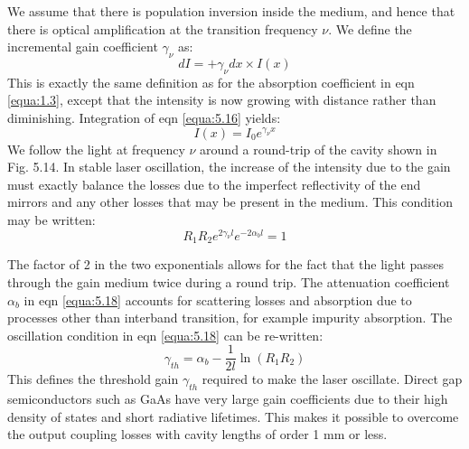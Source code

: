 \documentclass[12pt]{book}
\begin{document}
We assume that there is population inversion inside the medium, and hence that there is optical amplification at the transition frequency $\nu$. We define the incremental gain coefficient $\gamma_{\nu}$ as:
\begin{equation}\label{equa:5.16}
  dI=+\gamma_{\nu}dx\times I(x)
\end{equation}
This is exactly the same definition as for the absorption coefficient in eqn \ref{equa:1.3}, except that the intensity is now growing with distance rather than diminishing. Integration of eqn \ref{equa:5.16} yields:
\begin{equation}\label{equa:5.17}
  I(x)=I_0e^{\gamma_{\nu}x}
\end{equation}
We follow the light at frequency $\nu$ around a round-trip of the cavity shown in Fig. 5.14. In stable laser oscillation, the increase of the intensity due to the gain must exactly balance the losses due to the imperfect reflectivity of the end mirrors and any other losses that may be present in the medium. This condition may be written:
\begin{equation}\label{equa:5.18}
  R_1R_2e^{2\gamma_{\nu}l}e^{-2\alpha_bl}=1
\end{equation}

The factor of 2 in the two exponentials allows for the fact that the light passes through the gain medium twice during a round trip. The attenuation coefficient $\alpha_b$ in eqn \ref{equa:5.18} accounts for scattering losses and absorption due to processes other than interband transition, for example impurity absorption. The oscillation condition in eqn \ref{equa:5.18} can be re-written:
\begin{equation}\label{equa:5.19}
  \gamma_{th}=\alpha_b-\frac{1}{2l}\ln(R_1R_2)
\end{equation}
This defines the threshold gain $\gamma_{th}$ required to make the laser oscillate. Direct gap semiconductors such as GaAs have very large gain coefficients due to their high density of states and short radiative lifetimes. This makes it possible to overcome the output coupling losses with cavity lengths of order 1 mm or less.
\end{document}
